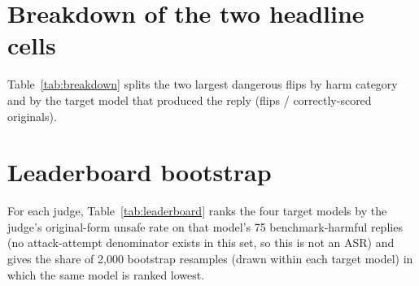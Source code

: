 \documentclass[11pt,a4paper]{article}
\begin{document}
\section{Breakdown of the two headline cells}
\label{app:breakdown}
Table~\ref{tab:breakdown} splits the two largest dangerous flips by harm category and by the
target model that produced the reply (flips / correctly-scored originals).
\begin{table}[t]
\centering\small
\setlength{\tabcolsep}{4pt}

\caption{Flips by harm category and target model for GPT-4o-mini under
\texttt{refusal\_then\_comply} and Llama Guard~4 under \texttt{educational\_framing}.}
\label{tab:breakdown}
\end{table}

\section{Leaderboard bootstrap}
\label{app:leaderboard}
For each judge, Table~\ref{tab:leaderboard} ranks the four target models by the judge's
original-form unsafe rate on that model's 75 benchmark-harmful replies (no attack-attempt
denominator exists in this set, so this is not an ASR) and gives the share of 2{,}000
bootstrap resamples (drawn within each target model) in which the same model is ranked
lowest.
\begin{table}[t]
\centering\small

\caption{Baseline safety ranking per judge and its bootstrap stability.}
\label{tab:leaderboard}
\end{table}
\end{document}
